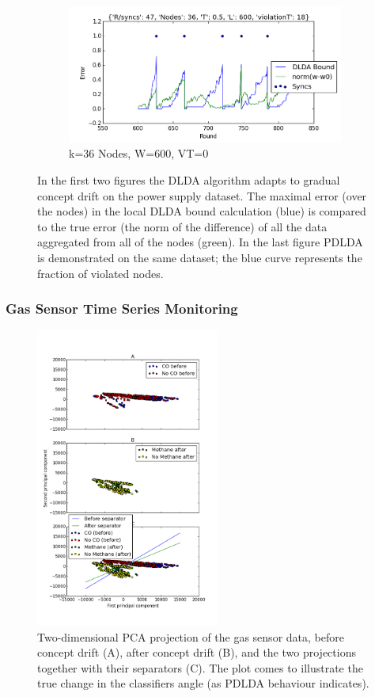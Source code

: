 \documentclass{sig-alternate-05-2015}
\begin{document}
\begin{figure}
    \begin{subfigure}[b]{0.5\textwidth}
        \includegraphics[width=\textwidth]{PowerSupply/36nodesProb.png}
        \caption{k=36 Nodes, W=600, VT=0}
        \label{fig:mouse}
    \end{subfigure}
    \caption{In the first two figures the DLDA algorithm adapts
  to gradual concept drift on the power supply dataset.  
  The maximal error (over the nodes) in the 
  local DLDA bound calculation (blue) is compared to the true
error (the norm of the difference) of all the data aggregated from
all of the nodes (green). In the last figure PDLDA
is demonstrated on the same dataset; the blue curve represents the
fraction of violated nodes.}\label{PowerSupplyFigures}
\end{figure}




\subsubsection{Gas Sensor Time Series Monitoring} 

\begin{figure}[h!]
\centering
\includegraphics[width=60mm]{BigGas/showData.png}
\caption{Two-dimensional PCA projection of the gas sensor data, 
before concept drift (A), after concept drift (B), 
and the two projections together with their separators (C). 
The plot comes to illustrate the true change in the classifiers angle (as PDLDA
behaviour indicates).}
\label{BigGasShowData}
\end{figure}
\end{document}
